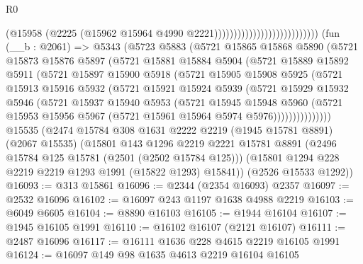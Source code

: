 \begin{lexlean}{R0}
\begin{coremodule}
                                                    (@15958
                                                      (@2225
                                                        (@15962
                                                          @15964
                                                          @4990
                                                          @2221)))))))))))))))))))))))))))
    (fun (__b : @2061) =>
    @5343
      (@5723
        @5883
        (@5721
          @15865
          @15868
          @5890
          (@5721
            @15873
            @15876
            @5897
            (@5721
              @15881
              @15884
              @5904
              (@5721
                @15889
                @15892
                @5911
                (@5721
                  @15897
                  @15900
                  @5918
                  (@5721
                    @15905
                    @15908
                    @5925
                    (@5721
                      @15913
                      @15916
                      @5932
                      (@5721
                        @15921
                        @15924
                        @5939
                        (@5721
                          @15929
                          @15932
                          @5946
                          (@5721
                            @15937
                            @15940
                            @5953
                            (@5721
                              @15945
                              @15948
                              @5960
                              (@5721
                                @15953
                                @15956
                                @5967
                                (@5721 @15961 @15964 @5974 @5976)))))))))))))))
    @15535
    (@2474
      @15784
      @308
      @1631
      @2222
      @2219
      (@1945 @15781 @8891)
      (@2067 @15535)
      (@15801
        @143
        @1296
        @2219
        @2221
        @15781
        @8891
        (@2496 @15784 @125 @15781 (@2501 (@2502 @15784 @125)))
        (@15801 @1294 @228 @2219 @2219 @1293 @1991 (@15822 @1293) @15841))
      (@2526 @15533 @1292))
@16093 := @313 @15861
@16096 := @2344 (@2354 @16093) @2357
@16097 := @2532 @16096
@16102 := @16097 @243 @1197 @1638 @4988 @2219
@16103 := @6049 @6605
@16104 := @8890 @16103
@16105 := @1944 @16104
@16107 := @1945 @16105 @1991
@16110 := @16102 @16107 (@2121 @16107)
@16111 := @2487 @16096
@16117 := @16111 @1636 @228 @4615 @2219 @16105 @1991
@16124 := @16097 @149 @98 @1635 @4613 @2219 @16104 @16105

\end{coremodule}
\end{lexlean}
